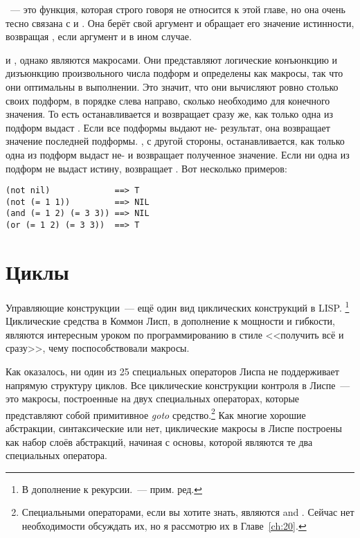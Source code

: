 ~--- это функция, которая строго говоря не относится к этой главе, но она очень
тесно связана с  и . Она берёт свой аргумент и обращает его значение
истинности, возвращая , если аргумент  и  в ином случае.

 и , однако являются макросами. Они представляют логические конъюнкцию
и дизъюнкцию произвольного числа подформ и определены как макросы, так что они оптимальны
в выполнении. Это значит, что они вычисляют ровно столько своих подформ, в порядке слева
направо, сколько необходимо для конечного значения. То есть  останавливается и
возвращает  сразу же, как только одна из подформ выдаст . Если все
подформы выдают не- результат, она возвращает значение последней
подформы. , с другой стороны, останавливается, как только одна из подформ выдаст
не- и возвращает полученное значение. Если ни одна из подформ не выдаст истину,
 возвращает . Вот несколько примеров:

\begin{lstlisting}
(not nil)             ==> T
(not (= 1 1))         ==> NIL
(and (= 1 2) (= 3 3)) ==> NIL
(or (= 1 2) (= 3 3))  ==> T
\end{lstlisting}

\section{Циклы}

Управляющие конструкции~--- ещё один вид циклических конструкций в LISP. \footnote{В
  дополнение к рекурсии.~--- прим. ред.} Циклические средства в Коммон Лисп, в дополнение к
мощности и гибкости, являются интересным уроком по программированию в стиле <<получить всё
и сразу>>, чему поспособствовали макросы.

Как оказалось, ни один из 25 специальных операторов Лиспа не поддерживает напрямую
структуру циклов. Все циклические конструкции контроля в Лиспе~--- это макросы, построенные
на двух специальных операторах, которые представляют собой примитивное \textit{goto}
средство.\footnote{Специальными операторами, если вы хотите знать, являются 
  and . Сейчас нет необходимости обсуждать их, но я рассмотрю их в Главе~\ref{ch:20}.} Как
многие хорошие абстракции, синтаксические или нет, циклические макросы в Лиспе построены
как набор слоёв абстракций, начиная с основы, которой являются те два специальных
оператора.

